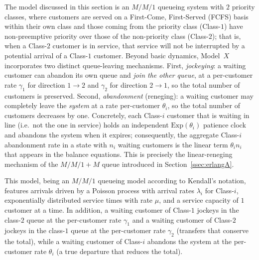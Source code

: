 The model discussed in this section is an $M/M/1$ queueing system with $2$ priority
classes, where customers are served on a First-Come, First-Served (FCFS) basis
within their own class and those coming from the priority class (Class-$1$) have
non-preemptive priority over those of the non-priority class (Class-$2$); that is,
when a Class-$2$ customer is in service, that service will not be interrupted by a
potential arrival of a Class-$1$ customer. Beyond basic dynamics, Model~$X$
incorporates two distinct queue-leaving mechanisms. First, \emph{jockeying}: a
waiting customer can abandon its own queue and \emph{join the other queue}, at a
per-customer rate $\gamma_1$ for direction $1\to2$ and $\gamma_2$ for 
direction $2\to1$, so the total number of customers is preserved. Second,
\emph{abandonment} (reneging): a waiting customer may completely leave the \emph{system
} at a rate per-customer $\theta_i$, so the total number of customers
decreases by one. Concretely, each Class-$i$ customer that is waiting in line
(i.e.\ not the one in service) holds an independent $\mathrm{Exp}(\theta_i)$
patience clock and abandons the system when it expires; consequently, the aggregate
Class-$i$ abandonment rate in a state with $n_i$ waiting customers is the linear
term $\theta_i n_i$ that appears in the balance equations. This is precisely the
linear-reneging mechanism of the $M/M/1+M$ queue introduced in Section~\ref{ssec:erlangA}.

This model, being an $M/M/1$ queueing model according to Kendall's notation,
features arrivals driven by a Poisson process with arrival rates $\lambda_i$ for
Class-$i$, exponentially distributed service times with rate $\mu$, and a service
capacity of $1$ customer at a time. In addition, a waiting customer of Class-$1$
jockeys in the class-$2$ queue at the per-customer rate $\gamma_1$ and a waiting
customer of Class-$2$ jockeys in the class-$1$ queue at the per-customer rate
$\gamma_2$ (transfers that conserve the total), while a waiting customer of
Class-$i$ abandons the system at the per-customer rate $\theta_i$ (a true departure
that reduces the total).

